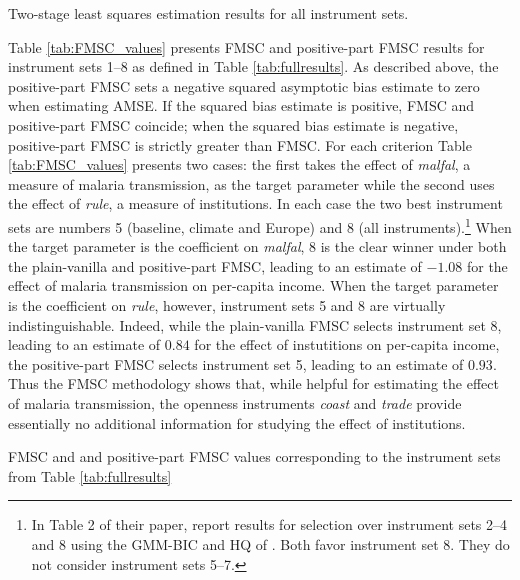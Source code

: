\begin{table}[h]
\centering

\caption{Two-stage least squares estimation results for all instrument sets.}
\label{tab:fullresults}

\end{table}

Table \ref{tab:FMSC_values} presents FMSC and positive-part FMSC results for instrument sets 1--8  as defined in Table \ref{tab:fullresults}. 
As described above, the positive-part FMSC sets a negative squared asymptotic bias estimate to zero when estimating AMSE.
If the squared bias estimate is positive, FMSC and positive-part FMSC coincide; when the squared bias estimate is negative, positive-part FMSC is strictly greater than FMSC. 
For each criterion Table \ref{tab:FMSC_values} presents two cases: the first takes the effect of \emph{malfal}, a measure of malaria transmission, as the target parameter while the second uses the effect of \emph{rule}, a measure of institutions. 
In each case the two best instrument sets are numbers 5 (baseline, climate and Europe) and 8 (all instruments).\footnote{In Table 2 of their paper, \cite{Carstensen2006} report results for selection over instrument sets 2--4 and 8 using the GMM-BIC and HQ of \cite{Andrews1999}. Both favor instrument set 8. They do not consider instrument sets 5--7.}
When the target parameter is the coefficient on \emph{malfal}, 8 is the clear winner under both the plain-vanilla and positive-part FMSC, leading to an estimate of $-1.08$ for the effect of malaria transmission on per-capita income.
When the target parameter is the coefficient on \emph{rule}, however, instrument sets 5 and 8 are virtually indistinguishable.
Indeed, while the plain-vanilla FMSC selects instrument set 8, leading to an estimate of $0.84$ for the effect of instutitions on per-capita income, the positive-part FMSC selects instrument set 5, leading to an estimate of $0.93$. 
Thus the FMSC methodology shows that, while helpful for estimating the effect of malaria transmission, the openness instruments \emph{coast} and \emph{trade} provide essentially no additional information for studying the effect of institutions.

\begin{table}[htbp]
	\centering
	
		\caption{FMSC and and positive-part FMSC values corresponding to the instrument sets from Table \ref{tab:fullresults}}
		\label{tab:FMSC_values}
\end{table}

